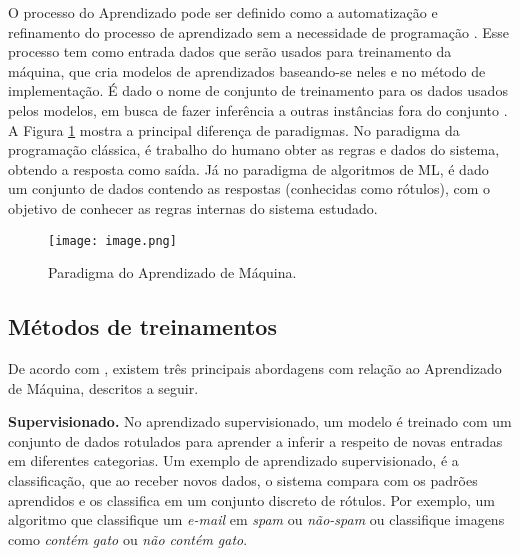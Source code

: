 O processo do Aprendizado pode ser definido como a automatização e refinamento do processo de aprendizado sem a necessidade de programação \cite{R2021}. Esse processo tem como entrada dados que serão usados para treinamento da máquina, que cria modelos de aprendizados baseando-se neles e no método de implementação. É dado o nome de conjunto de treinamento para os dados usados pelos modelos, em busca de fazer inferência a outras instâncias fora do conjunto \cite{breiman2001}. A Figura \ref{fig:enter-label} mostra a principal diferença de paradigmas. No paradigma da programação clássica, é trabalho do humano obter as regras e dados do sistema, obtendo a resposta como saída. Já no paradigma de algoritmos de ML, é dado um conjunto de dados contendo as respostas (conhecidas como rótulos), com o objetivo de conhecer as regras internas do sistema estudado.

\begin{figure}[H]
    \centering
    \texttt{[image: image.png]}
    \caption{Paradigma do Aprendizado de Máquina.}
    \label{fig:enter-label}
\end{figure}




\subsection{Métodos de treinamentos}
\label{ml:met}
De acordo com \citep{Zehra2023}, existem três principais abordagens com relação ao Aprendizado de Máquina, descritos a seguir.

\textbf{Supervisionado.} No aprendizado supervisionado, um modelo é treinado com um conjunto de dados rotulados para aprender a inferir a respeito de novas entradas em diferentes categorias. Um exemplo de aprendizado supervisionado, é a classificação, que ao receber novos dados, o sistema compara com os padrões aprendidos e os classifica em um conjunto discreto de rótulos. Por exemplo, um algoritmo que classifique um \textit{e-mail} em \textit{spam} ou \textit{não-spam} ou classifique imagens como \textit{contém gato} ou \textit{não contém gato}. %
    
